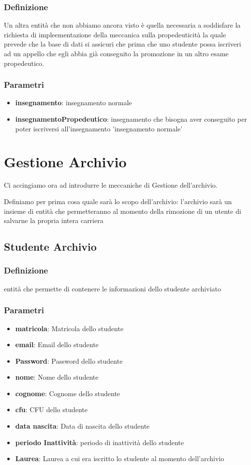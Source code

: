 \subsubsection{Definizione}
Un altra entità che non abbiamo ancora visto è quella necessaria a soddisfare la richiesta di impleementazione della meccanica sulla propedeuticità la quale prevede che la base di dati si assicuri che prima che uno studente possa iscriveri ad un appello che egli abbia già conseguito la promozione in un altro esame propedeutico.
\subsubsection{Parametri}
\begin{itemize}
    \item \textbf{insegnamento}: insegnamento normale
    \item \textbf{insegnamentoPropedeutico}: insegnamento che bisogna aver conseguito per poter iscriversi all'insegnamento 'insegnamento normale'
\end{itemize}
\section{Gestione Archivio}\label{archivio}
Ci accingiamo ora ad introdurre le meccaniche di Gestione dell'archivio. 

Definiamo per prima cosa quale sarà lo scopo dell'archivio: l'archivio sarà un insieme di entità che permetteranno al momento della rimozione di un utente di salvarne la propria intera carriera
\subsection{Studente Archivio} \label{studente archvio}
\subsubsection{Definizione}
entità che permette di contenere le informazioni dello studente archiviato
\subsubsection{Parametri}
\begin{itemize}
    \item \textbf{matricola}: Matricola dello studente
    \item \textbf{email}: Email dello studente 
    \item \textbf{Password}: Password dello studente 
    \item \textbf{nome}: Nome dello studente
    \item \textbf{cognome}: Cognome dello studente 
    \item \textbf{cfu}: CFU dello studente 
    \item \textbf{data nascita}: Data di nascita dello studente 
    \item \textbf{periodo Inattività}: periodo di inattività dello studente
    \item \textbf{Laurea}: Laurea a cui era iscritto lo studente al momento dell'archivio

\end{itemize}
